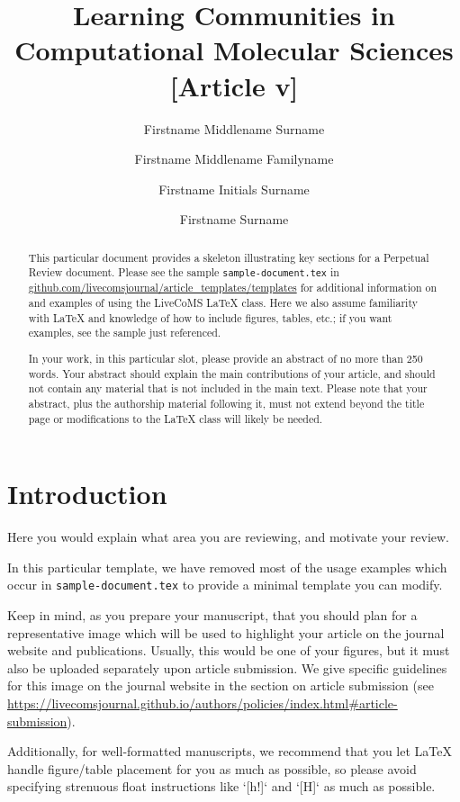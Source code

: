 \documentclass[9pt,review]{livecoms}
\title{Learning Communities in Computational Molecular Sciences [Article v\versionnumber]}
\author[1*]{Firstname Middlename Surname}
\author[1,2\authfn{1}\authfn{3}]{Firstname Middlename Familyname}
\author[2\authfn{1}\authfn{4}]{Firstname Initials Surname}
\author[2*]{Firstname Surname}
\affil[1]{Institution 1}
\affil[2]{Institution 2}
\begin{document}
\begin{frontmatter}
\maketitle

\begin{abstract}
This particular document provides a skeleton illustrating key sections for a Perpetual Review document.
Please see the sample \texttt{sample-document.tex} in \url{github.com/livecomsjournal/article_templates/templates} for additional information on and examples of using the LiveCoMS LaTeX class.
Here we also assume familiarity with LaTeX and knowledge of how to include figures, tables, etc.; if you want examples, see the sample just referenced.

In your work, in this particular slot, please provide an abstract of no more than 250 words.
Your abstract should explain the main contributions of your article, and should not contain any material that is not included in the main text.
Please note that your abstract, plus the authorship material following it, must not extend beyond the title page or modifications to the LaTeX class will likely be needed.
\end{abstract}

\end{frontmatter}




\section{Introduction}

Here you would explain what area you are reviewing, and motivate your review.

In this particular template, we have removed most of the usage examples which occur in \texttt{sample-document.tex} to provide a minimal template you can modify.

Keep in mind, as you prepare your manuscript, that you should plan for a representative image  which will be used to highlight your article on the journal website and publications. Usually, this would be one of your figures, but it must also be uploaded separately upon article submission. We give specific guidelines for this image on the journal website in the section on article submission (see \url{https://livecomsjournal.github.io/authors/policies/index.html#article-submission}).

Additionally, for well-formatted manuscripts, we recommend that you let LaTeX handle figure/table placement for you as much as possible, so please avoid specifying strenuous float instructions like `[h!]` and `[H]` as much as possible.
\end{document}
